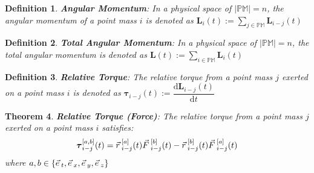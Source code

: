 \documentclass[12pt]{amsart}
\newtheorem{theorem}{Theorem}[section]
\newtheorem{definition}[theorem]{Definition}
\let\oldvec\vec
\renewcommand{\vec}[1]{\oldvec{#1}\hspace{0.1em}}
\begin{document}
\begin{definition}
\textbf{Angular Momentum}: In a physical space of $\left | \mathbb{PM} \right | = n$, the angular momentum of a point mass $i$ is denoted as $ \boldsymbol{L}_i(t) := \displaystyle \sum_{j \in \mathbb{PM}} \boldsymbol{L}_{i-j}(t) $ 
\end{definition}

\begin{definition}
\textbf{Total Angular Momentum}: In a physical space of $\left | \mathbb{PM} \right | = n$, the total angular momentum is denoted as $\boldsymbol{L}(t) := \displaystyle \sum_{i \in \mathbb{PM}} \boldsymbol{L}_{i} (t)$ 
\end{definition}


\begin{definition}
\textbf{Relative Torque}: The relative torque from a point mass $j$ exerted on a point mass $i$ is denoted as $ \boldsymbol{\tau}_{i-j} (t) := \dfrac{\mathrm{d} \boldsymbol{L}_{i-j}(t)}{\mathrm{d} t} $
\end{definition}

\begin{theorem}
    \textbf{Relative Torque (Force)}: The relative torque from a point mass $j$ exerted on a point mass $i$ satisfies: 
    $$\boldsymbol{\tau}_{i-j} ^{[a,b]} (t) = \vec{r}^{[a]}_{i-j} (t)\vec{F}^{[b]}_{i-j} (t) - \vec{r}^{[b]}_{i-j} (t) \vec{F}^{[a]}_{i-j} (t)$$
    where $a, b \in \{ \vec{e}_t, \vec{e}_x, \vec{e}_y, \vec{e}_z \}$
\end{theorem}
\end{document}
